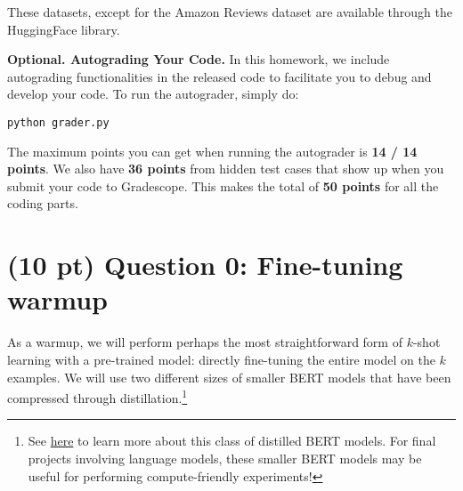 \documentclass[12pt]{article}
\begin{document}
These datasets, except for the Amazon Reviews dataset are available through the HuggingFace library.

\vspace{0.2cm}
\noindent\textbf{Optional. Autograding Your Code.}
In this homework, we include autograding functionalities in the released code to facilitate you to debug and develop your code. To run the autograder, simply do:

\texttt{python grader.py}

\noindent The maximum points you can get when running the autograder is \textbf{14 / 14 points}. We also have \textbf{36 points} from hidden test cases that show up when you submit your code to Gradescope. This makes the total of \textbf{50 points} for all the coding parts.

\section*{(10 pt) Question 0: Fine-tuning warmup}
As a warmup, we will perform perhaps the most straightforward form of $k$-shot learning with a pre-trained model: directly fine-tuning the entire model on the $k$ examples. We will use two different sizes of smaller BERT models that have been compressed through distillation.\footnote{See \href{https://arxiv.org/pdf/1908.08962.pdf}{here} to learn more about this class of distilled BERT models. For final projects involving language models, these smaller BERT models may be useful for performing compute-friendly experiments!}
\end{document}

